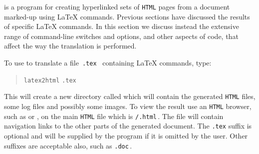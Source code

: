 
\startdocument
%
\label{sec:man}
\html{\\}\noindent
\latextohtml{} is a program for creating hyperlinked sets of \texttt{HTML} pages
from a document marked-up using \LaTeX{} commands.
Previous sections have discussed the results of specific \LaTeX{} commands.
In this section we discuss instead the extensive range
of command-line switches and options, and other aspects of \Perl{} code,
that affect the way the translation is performed.

\medskip\noindent
To use \latextohtml{} to translate a file~\texttt{.tex }
containing \LaTeX{} commands, type:
\begin{quote}
\texttt{latex2html} \texttt{.tex} 
\end{quote}

%
%
%
\html{\\}%
\noindent
This will create a new directory called  which will contain 
the generated \texttt{HTML} files, some log files and possibly some images.
To view the result use an \texttt{HTML} browser, such as 
 or ,
on the main \texttt{HTML} file which is \texttt{/.html}\,. 
The file will contain navigation links 
to the other parts of the generated document.
%
%
%
The \texttt{.tex} suffix is optional and will be supplied
by the program if it is omitted by the user.
Other suffixes are acceptable also, such as \texttt{.doc}\,.


